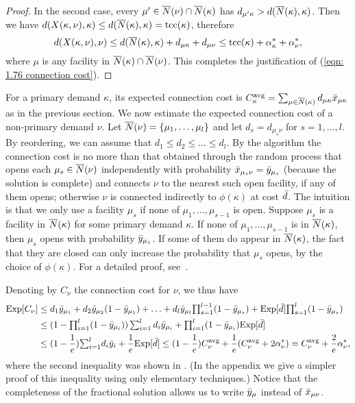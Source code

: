 \documentclass[11pt]{article}
\begin{document}
\begin{proof}
 In the second case, every $\mu'\in
{\overline{N}}(\nu)\cap {\overline{N}}(\kappa)$ has $d_{\mu'\kappa} >
d({\overline{N}}(\kappa),\kappa)$. Then we have
$d(X(\kappa,\nu),\kappa)\leq
d({\overline{N}}(\kappa),\kappa)=\textrm{tcc}(\kappa)$, therefore
\begin{equation*}
  d(X(\kappa,\nu), \nu) \leq d({\overline{N}}(\kappa), \kappa) +
  d_{\mu\kappa} + d_{\mu\nu} \leq \textrm{tcc}(\kappa) +
  \alpha_{\kappa}^\ast + \alpha_{\nu}^\ast,  
\end{equation*}
where $\mu$ is any facility in ${\overline{N}}(\kappa)\cap {\overline{N}}(\nu)$.
This completes the justification of (\ref{eqn: 1.76
  connection cost}).
\end{proof}

For a primary demand $\kappa$, its expected connection cost
is $C^{\mbox{\scriptsize\rm avg}}_{\kappa} = \sum_{\mu\in{\overline{N}}(\kappa)} d_{\mu\kappa}{\bar x}_{\mu\kappa}$
as in the previous section. We now estimate the expected
connection cost of a non-primary demand $\nu$. Let
${\overline{N}}(\nu) = { \left\{ \mu_1,\ldots,\mu_l \right\} }$ and let $d_s =
d_{\mu_s\nu}$ for $s = 1,\ldots,l$. By reordering, we can
assume that $d_1 \le d_2 \le \ldots \le d_l$. By the
algorithm the connection cost is no more than that obtained
through the random process that opens each $\mu_s\in
{\overline{N}}(\nu)$ independently with probability ${\bar x}_{\mu_s
  \nu} ={\bar y}_{\mu_s}$ (because the solution is complete)
and connects $\nu$ to the nearest such open facility, if any
of them opens; otherwise $\nu$ is connected indirectly to
$\phi(\kappa)$ at cost ${\bar d}$. The intuition is that we
only use a facility $\mu_s$ if none of
$\mu_1,\ldots,\mu_{s-1}$ is open. Suppose $\mu_s$ is a
facility in ${\overline{N}}(\kappa)$ for some primary demand
$\kappa$. If none of $\mu_1,\ldots,\mu_{s-1}$ is in
${\overline{N}}(\kappa)$, then $\mu_s$ opens with probability
${\bar y}_{\mu_s}$. If some of them do appear in
${\overline{N}}(\kappa)$, the fact that they are closed can only
increase the probability that $\mu_s$ opens, by the choice
of $\phi(\kappa)$.  For a detailed proof,
see~\cite{ChudakS04}.

Denoting by $C_\nu$ the connection cost for $\nu$, we thus have
%
\begin{align*}
  \mbox{\rm Exp}[C_\nu] &\leq d_1 {\bar y}_{\mu_1} + d_2 {\bar y}_{\mu_2}(1-{\bar y}_{\mu_1}) + \ldots
 		+  d_l {\bar y}_{\mu_l}\textstyle{\prod_{s=1}^{l-1}}(1-{\bar y}_{\mu_s}) 
		+  \mbox{\rm Exp}[{\bar d}]\textstyle{\prod_{s=1}^{l}} (1-{\bar y}_{\mu_s})
		\\
  &\leq (1-\textstyle{\prod_{i=1}^l} (1-{\bar y}_{\mu_i}))
  	\sum_{i=1}^l d_i{\bar y}_{\mu_i} + {\textstyle\prod_{i=1}^l} (1-\bar  y_{\mu_i})\mbox{\rm Exp}[{\bar d}]
	\\
  &\leq (1-\frac{1}{e}) {\textstyle\sum_{i=1}^l} d_i{\bar y}_i 
	+ \frac{1}{e} \mbox{\rm Exp}[{\bar d}] \leq (1-\frac{1}{e}) C^{{\mbox{\scriptsize\rm avg}}}_{\nu} 
	+	\frac{1}{e}	(C^{{\mbox{\scriptsize\rm avg}}}_{\nu} + 2\alpha_{\nu}^\ast) = C^{{\mbox{\scriptsize\rm avg}}}_{\nu} + \frac{2}{e}\alpha_{\nu}^\ast,
\end{align*}
%
where the second inequality was shown in
\cite{ChudakS04}. (In the appendix we give a simpler
proof of this inequality using only elementary techniques.)  Notice that the
completeness of the fractional solution allows us to write
${\bar y}_{\mu}$ instead of ${\bar x}_{\mu\nu}$.
\end{document}
